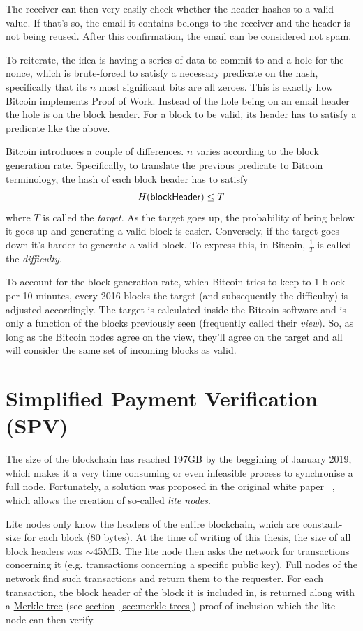 The receiver can then very easily check whether the header hashes to a valid value. If that's so, the email it contains belongs to the receiver and the header is not being reused. After this confirmation, the email can be considered not spam.

To reiterate, the idea is having a series of data to commit to and a hole for the nonce, which is brute-forced to satisfy a necessary predicate on the hash, specifically that its $n$ most significant bits are all zeroes. This is exactly how Bitcoin implements Proof of Work. Instead of the hole being on an email header the hole is on the block header. For a block to be valid, its header has to satisfy a predicate like the above.

Bitcoin introduces a couple of differences. $n$ varies according to the block generation rate. Specifically, to translate the previous predicate to Bitcoin terminology, the hash of each block header has to satisfy
\begin{equation} \label{eq:PoW}
  H({\sf blockHeader}) \le T
\end{equation}
where $T$ is called the \emph{target}. As the target goes up, the probability of being below it goes up and generating a valid block is easier. Conversely, if the target goes down it's harder to generate a valid block. To express this, in Bitcoin, $\frac{1}{T}$ is called the \emph{difficulty}.

To account for the block generation rate, which Bitcoin tries to keep to 1 block per 10 minutes, every 2016 blocks the target (and subsequently the difficulty) is adjusted accordingly. The target is calculated inside the Bitcoin software and is only a function of the blocks previously seen (frequently called their \emph{view}). So, as long as the Bitcoin nodes agree on the view, they'll agree on the target and all will consider the same set of incoming blocks as valid.

\section{Simplified Payment Verification (SPV)}
The size of the blockchain has reached 197GB by the beggining of January 2019, which makes it a very time consuming or even infeasible process to synchronise a full node. Fortunately, a solution was proposed in the original white paper ~\cite{Nakamoto_bitcoin:a}, which allows the creation of so-called \emph{lite nodes}.

Lite nodes only know the headers of the entire blockchain, which are constant-size for each block (80 bytes). At the time of writing of this thesis, the size of all block headers was $\sim$45MB. The lite node then asks the network for transactions concerning it (e.g. transactions concerning a specific public key). Full nodes of the network find such transactions and return them to the requester. For each transaction, the block header of the block it is included in, is returned along with a \hyperref[sec:merkle-trees]{Merkle tree} (see \hyperref[sec:merkle-trees]{section}~\ref{sec:merkle-trees}) proof of inclusion which the lite node can then verify.

